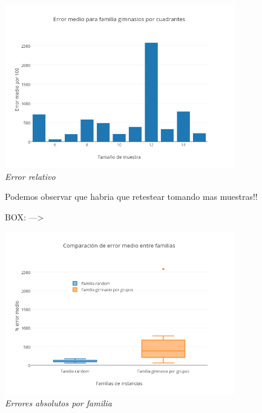 \vspace*{0.3cm} \vspace*{0.3cm}
  \begin{center}
 \includegraphics[width=0.75\textwidth]{./EJ2/familiaError.png}
\\{\textit{Error relativo}}
\end{center}

Podemos observar que habria que retestear tomando mas muestras!!

BOX: --->

\vspace*{0.3cm} \vspace*{0.3cm}
  \begin{center}
 \includegraphics[width=0.75\textwidth]{./EJ2/box2.png}
\\{\textit{Errores absolutos por familia}}
\end{center}